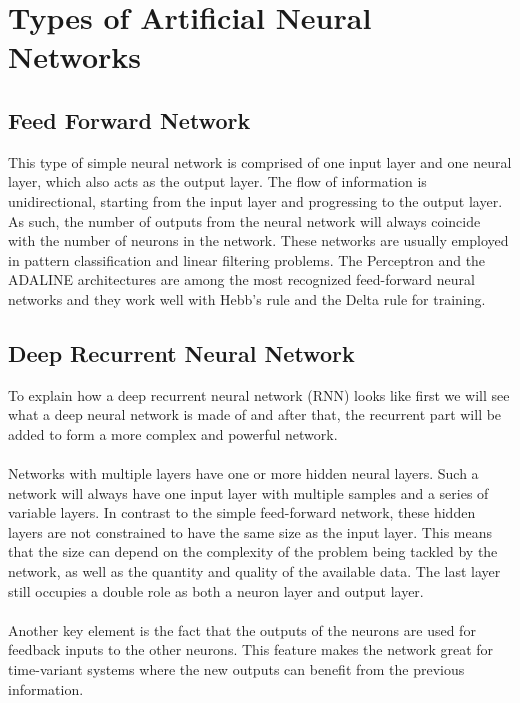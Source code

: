 \section{Types of Artificial Neural Networks}
\subsection{Feed Forward Network}
This type of simple neural network is comprised of one input
layer and one neural layer, which also acts as the output layer.
The flow of information is unidirectional, starting from the input layer and progressing to the output layer. As such, the number of outputs from the neural network will always coincide with the number of neurons in the network.
These networks are usually employed in
pattern classification and linear filtering problems. 
The Perceptron and the ADALINE architectures are among the most recognized feed-forward neural networks and they work well with Hebb's rule and the Delta rule for training.

\subsection{Deep Recurrent Neural Network}
To explain how a deep recurrent neural network (RNN) looks like first we will see what a deep neural network is made of and after that, the recurrent part will be added to form a more complex and powerful network.\\\\
Networks with multiple layers have one or more hidden neural layers. Such a network will always have one input layer with multiple samples and a series of variable layers.
In contrast to the simple feed-forward network, these hidden layers are not constrained to have the same size as the input layer. This means
that the size can depend on the complexity of the problem being
tackled by the network, as well as the quantity and quality of the available data. The last layer still occupies a double role as both a neuron layer and output layer.\\\\
Another key element is the fact that the outputs of the neurons are used for feedback inputs to the other neurons.
This feature makes the network great for time-variant systems where the new outputs can benefit from the previous information.

